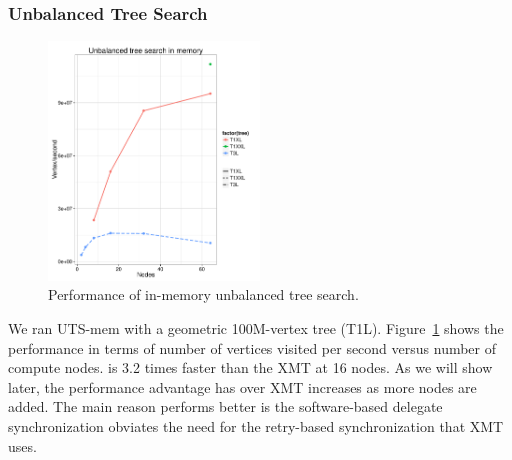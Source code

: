 {\subsubsection{Unbalanced Tree Search}
\begin{figure}[ht]
    \begin{center}
      \includegraphics[width=0.5\textwidth]{figs/uts_scale.pdf}
    \end{center}
    \caption{Performance of in-memory unbalanced tree search.}
    \label{fig:uts_compare}
\end{figure}

We ran UTS-mem with a geometric 100M-vertex tree
(T1L). Figure~\ref{fig:uts_compare} shows the performance in terms of
number of vertices visited per second versus number of compute
nodes. \Grappa is 3.2 times faster than the XMT at 16 nodes.  As we will show later, the performance advantage \Grappa has over XMT increases as more nodes are added.  The main reason \Grappa performs better is the software-based delegate synchronization obviates the need for the retry-based synchronization that XMT uses.

}
